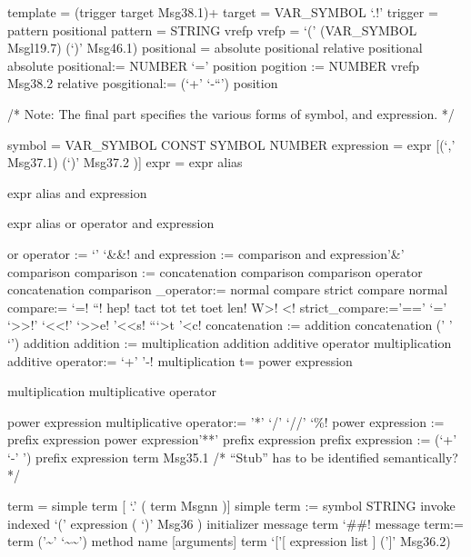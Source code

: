 template = (trigger \textbar{} target \textbar{} Msg38.1)+ target =
VAR\_SYMBOL \textbar{} `.!' trigger = pattern \textbar{} positional
pattern = STRING \textbar{} vrefp vrefp = `(' (VAR\_SYMBOL \textbar{}
Msgl19.7) (`)' \textbar{} Msg46.1) positional = absolute positional
\textbar{} relative positional absolute positional:= NUMBER `=' position
pogition := NUMBER \textbar{} vrefp \textbar{} Msg38.2 relative
posgitional:= (`+' \textbar{} `-``') position

/* Note: The final part specifies the various forms of symbol, and
expression. */

symbol = VAR\_SYMBOL \textbar{} CONST SYMBOL \textbar{} NUMBER
expression = expr {[}(`,' Msg37.1) \textbar{} (`)' Msg37.2 ){]} expr =
expr alias

expr alias and expression

expr alias or operator and expression

or operator := `\textbar{}' \textbar{} `\&\&! and expression :=
comparison \textbar{} and expression'\&' comparison comparison :=
concatenation \textbar{} comparison comparison operator concatenation
comparison \_operator:= normal compare \textbar{} strict compare normal
compare:= `=! \textbar{} ``\s! \textbar{} hep! \textbar{} tact
\textbar{} tot \textbar{} tet \textbar{} toet len! W\textgreater!
\textless! strict\_compare:='==' \textbar{} `\s=' \textbar{}
`\textgreater\textgreater!' \textbar{} `\textless\textless!' \textbar{}
`\textgreater\textgreater e! \textbar{}'\textless\textless s! \textbar{}
```\e\textgreater t \textbar{}'\textless c! concatenation := addition
\textbar{} concatenation (' ' \textbar{} `\textbar\textbar{}') addition
addition := multiplication \textbar{} addition additive operator
multiplication additive operator:= `+' \textbar{} '-! multiplication t=
power expression

multiplication multiplicative operator

power expression multiplicative operator:= '*' \textbar{} `/' \textbar{}
`//' \textbar{} `\%! power expression := prefix expression \textbar{}
power expression'**' prefix expression prefix expression := (`+'
\textbar{} `-' \textbar{} '\textquotesingle) prefix expression term
\textbar{} Msg35.1 /* ``Stub'' has to be identified semantically? */

term = simple term {[} `.' ( term \textbar{} Msgnn ){]} simple term :=
symbol \textbar{} STRING \textbar{} invoke \textbar{} indexed `('
expression ( `)' \textbar{} Msg36 ) initializer \textbar{} message term
`\#\#! message term:= term ('\textasciitilde' \textbar{}
`\textasciitilde\textasciitilde{}') method name {[}arguments{]} term
`{[}'{[} expression list {]} ('{]}' \textbar{} Msg36.2)

